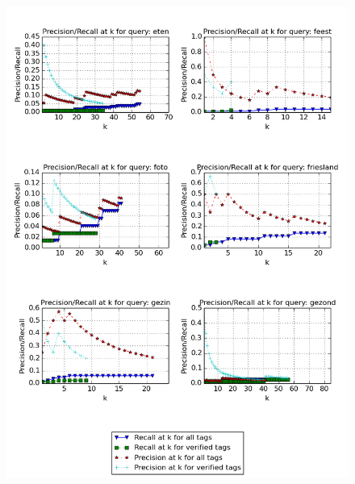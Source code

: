 \begin{figure}[H]
\centering
\includegraphics[width=\textwidth]{appendixd/queries-eten}
\end{figure}


